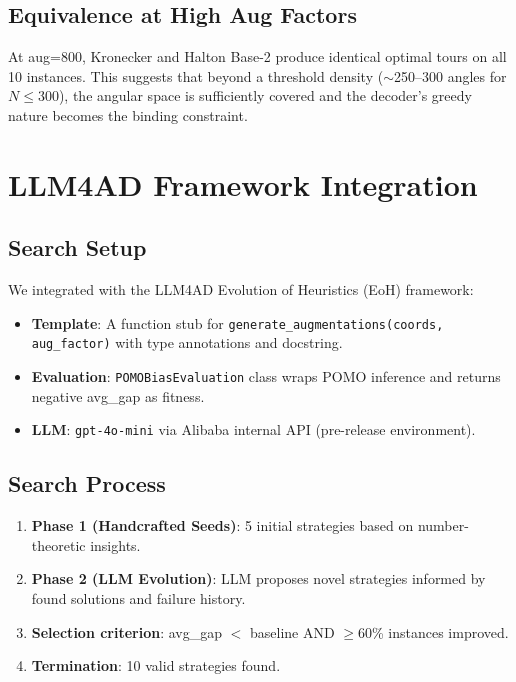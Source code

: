 \documentclass[11pt,a4paper]{article}
\begin{document}
\subsection{Equivalence at High Aug Factors}

At aug=800, Kronecker and Halton Base-2 produce identical optimal tours on
all 10 instances. This suggests that beyond a threshold density
($\sim$250--300 angles for $N \leq 300$), the angular space is sufficiently
covered and the decoder's greedy nature becomes the binding constraint.

\section{LLM4AD Framework Integration}
\label{sec:llm4ad}

\subsection{Search Setup}

We integrated with the LLM4AD Evolution of Heuristics (EoH)
framework:
\begin{itemize}
  \item \textbf{Template}: A function stub for
        \texttt{generate\_augmentations(coords, aug\_factor)} with type
        annotations and docstring.
  \item \textbf{Evaluation}: \texttt{POMOBiasEvaluation} class wraps POMO
        inference and returns negative avg\_gap as fitness.
  \item \textbf{LLM}: \texttt{gpt-4o-mini} via Alibaba internal API
        (pre-release environment).
\end{itemize}

\subsection{Search Process}

\begin{enumerate}
  \item \textbf{Phase 1 (Handcrafted Seeds)}: 5 initial strategies based on
        number-theoretic insights.
  \item \textbf{Phase 2 (LLM Evolution)}: LLM proposes novel strategies
        informed by found solutions and failure history.
  \item \textbf{Selection criterion}: avg\_gap $<$ baseline AND $\geq$60\%
        instances improved.
  \item \textbf{Termination}: 10 valid strategies found.
\end{enumerate}
\end{document}
